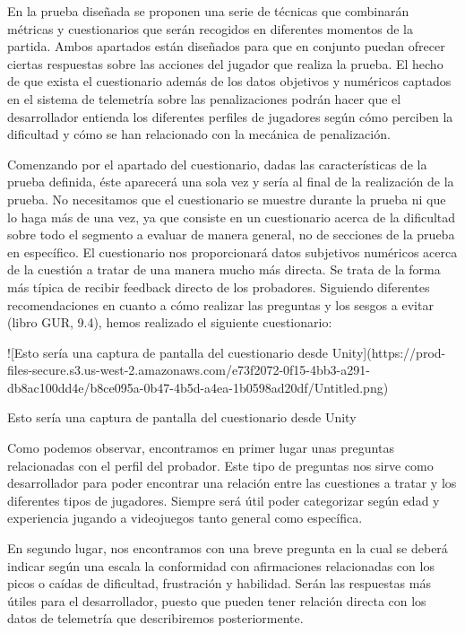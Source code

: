 En la prueba diseñada se proponen una serie de técnicas que combinarán métricas y cuestionarios que serán recogidos en diferentes momentos de la partida. Ambos apartados están diseñados para que en conjunto puedan ofrecer ciertas respuestas sobre las acciones del jugador que realiza la prueba. El hecho de que exista el cuestionario además de los datos objetivos y numéricos captados en el sistema de telemetría sobre las penalizaciones podrán hacer que el desarrollador entienda los diferentes perfiles de jugadores según cómo perciben la dificultad y cómo se han relacionado con la mecánica de penalización.


Comenzando por el apartado del cuestionario, dadas las características de la prueba definida, éste aparecerá una sola vez y sería al final de la realización de la prueba. No necesitamos que el cuestionario se muestre durante la prueba ni que lo haga más de una vez, ya que consiste en un cuestionario acerca de la dificultad sobre todo el segmento a evaluar de manera general, no de secciones de la prueba en específico. El cuestionario nos proporcionará datos subjetivos numéricos acerca de la cuestión a tratar de una manera mucho más directa. Se trata de la forma más típica de recibir feedback directo de los probadores. Siguiendo diferentes recomendaciones en cuanto a cómo realizar las preguntas y los sesgos a evitar (libro GUR, 9.4), hemos realizado el siguiente cuestionario:


![Esto sería una captura de pantalla del cuestionario desde Unity](https://prod-files-secure.s3.us-west-2.amazonaws.com/e73f2072-0f15-4bb3-a291-db8ac100dd4e/b8ce095a-0b47-4b5d-a4ea-1b0598ad20df/Untitled.png)


Esto sería una captura de pantalla del cuestionario desde Unity


Como podemos observar, encontramos en primer lugar unas preguntas relacionadas con el perfil del probador. Este tipo de preguntas nos sirve como desarrollador para poder encontrar una relación entre las cuestiones a tratar y los diferentes tipos de jugadores. Siempre será útil poder categorizar según edad y experiencia jugando a videojuegos tanto general como específica. 


En segundo lugar, nos encontramos con una breve pregunta en la cual se deberá indicar según una escala la conformidad con afirmaciones relacionadas con los picos o caídas de dificultad, frustración y habilidad. Serán las respuestas más útiles para el desarrollador, puesto que pueden tener relación directa con los datos de telemetría que describiremos posteriormente.


